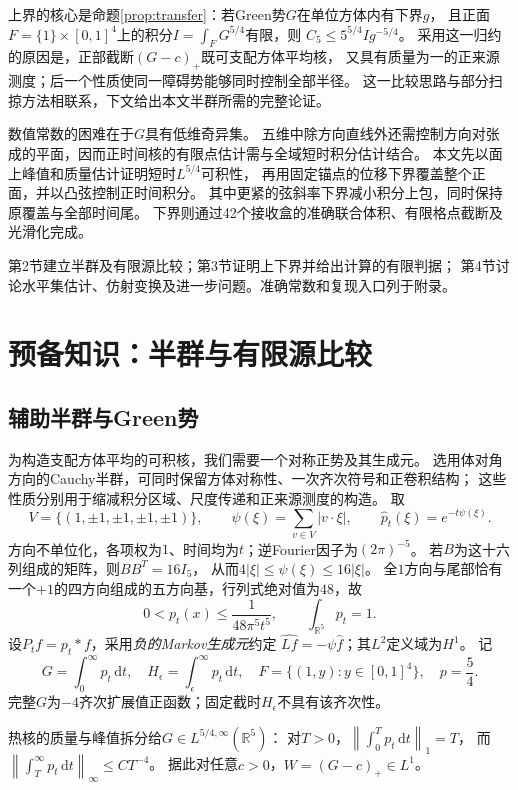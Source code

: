 \documentclass[UTF8,fontset=fandol,zihao=-4,a4paper]{ctexart}
\newcommand{\R}{\mathbb R}
\newcommand{\1}{\mathbf 1}
\newcommand{\dd}{\,\mathrm d}
\newcommand{\norm}[1]{\left\lVert#1\right\rVert}
\begin{document}
上界的核心是命题\ref{prop:transfer}：若Green势$G$在单位方体内有下界$g$，
且正面$F=\{1\}\times[0,1]^4$上的积分$I=\int_FG^{5/4}$有限，则
$C_5\le5^{5/4}Ig^{-5/4}$。
采用这一归约的原因是，正部截断$(G-c)_+$既可支配方体平均核，
又具有质量为一的正来源测度；后一个性质使同一障碍势能够同时控制全部半径。
这一比较思路与部分扫掠方法相联系\cite{Lin2026}，下文给出本文半群所需的完整论证。

数值常数的困难在于$G$具有低维奇异集。
五维中除方向直线外还需控制方向对张成的平面，因而正时间核的有限点估计需与全域短时积分估计结合。
本文先以面上峰值和质量估计证明短时$L^{5/4}$可积性，
再用固定锚点的位移下界覆盖整个正面，并以凸弦控制正时间积分。
其中更紧的弦斜率下界减小积分上包，同时保持原覆盖与全部时间尾。
下界则通过42个接收盒的准确联合体积、有限格点截断及光滑化完成。

第2节建立半群及有限源比较；第3节证明上下界并给出计算的有限判据；
第4节讨论水平集估计、仿射变换及进一步问题。准确常数和复现入口列于附录。

\section{预备知识：半群与有限源比较}
\subsection{辅助半群与Green势}
为构造支配方体平均的可积核，我们需要一个对称正势及其生成元。
选用体对角方向的Cauchy半群，可同时保留方体对称性、一次齐次符号和正卷积结构；
这些性质分别用于缩减积分区域、尺度传递和正来源测度的构造。
取
\[
 V=\{(1,\pm1,\pm1,\pm1,\pm1)\},\qquad
 \psi(\xi)=\sum_{v\in V}|v\cdot\xi|,\qquad
 \widehat p_t(\xi)=e^{-t\psi(\xi)}.
\]
方向不单位化，各项权为$1$、时间均为$t$；逆Fourier因子为$(2\pi)^{-5}$。
若$B$为这十六列组成的矩阵，则$BB^{T}=16I_5$，
从而$4|\xi|\le\psi(\xi)\le16|\xi|$。
全$1$方向与尾部恰有一个$+1$的四方向组成的五方向基，行列式绝对值为$48$，故
\[
 0<p_t(x)\le\frac1{48\pi^5t^5},\qquad \int_{\R^5}p_t=1.
\]
设$P_t f=p_t*f$，采用\emph{负的Markov生成元}约定
$\widehat{Lf}=-\psi\widehat f$；其$L^2$定义域为$H^1$。
记
\[
 G=\int_0^\infty p_t\dd t,\quad
 H_\epsilon=\int_\epsilon^\infty p_t\dd t,\quad
 F=\{(1,y):y\in[0,1]^4\},\quad p=\frac54.
\]
完整$G$为$-4$齐次扩展值正函数；固定截时$H_\epsilon$不具有该齐次性。

热核的质量与峰值拆分给$G\in L^{5/4,\infty}(\R^5)$：
对$T>0$，$\norm{\int_0^Tp_t\dd t}_1=T$，
而$\norm{\int_T^\infty p_t\dd t}_\infty\le C T^{-4}$。
据此对任意$c>0$，$W=(G-c)_+\in L^1$。
\end{document}
